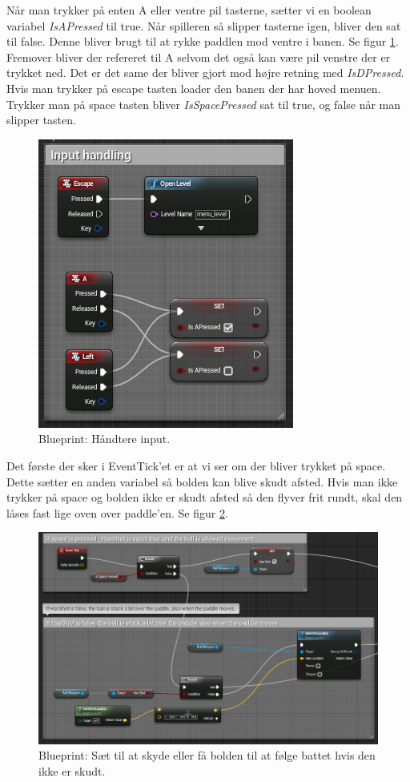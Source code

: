 Når man trykker på enten A eller ventre pil tasterne, sætter vi en boolean variabel \textit{IsAPressed} til true. Når spilleren så slipper tasterne igen, bliver den sat til false. Denne bliver brugt til at rykke paddlen mod ventre i banen. Se figur \ref{dia:paddlehandleinput}. Fremover bliver der refereret til A selvom det også kan være pil venstre der er trykket ned. Det er det same der bliver gjort mod højre retning med \textit{IsDPressed}. Hvis man trykker på escape tasten loader den banen der har hoved menuen. Trykker man på space tasten bliver \textit{IsSpacePressed} sat til true, og false når man slipper tasten.

\begin{figure}
	\begin{center}
		\caption{Blueprint: Håndtere input.}
		\label{dia:paddlehandleinput}
		\includegraphics[width=0.50\linewidth]{pictures/blueprints/paddle-handle-input}
		\end{center}
\end{figure}

Det første der sker i EventTick'et er at vi ser om der bliver trykket på space. Dette sætter en anden variabel så bolden kan blive skudt afsted. Hvis man ikke trykker på space og bolden ikke er skudt afsted så den flyver frit rundt, skal den låses fast lige oven over paddle'en. Se figur \ref{dia:paddlelockball}.

\begin{figure}
	\begin{center}
		\caption{Blueprint: Sæt til at skyde eller få bolden til at følge battet hvis den ikke er skudt.}
		\label{dia:paddlelockball}
		\includegraphics[width=0.98\linewidth]{pictures/blueprints/paddle-lock-ball}
		\end{center}
\end{figure}

